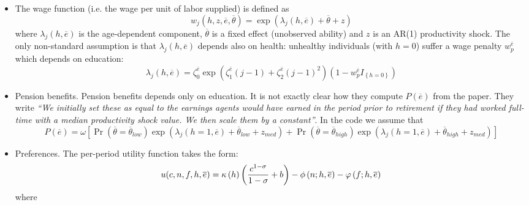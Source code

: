 \documentclass[12pt,a4paper]{article}
\begin{document}
\begin{itemize}
\item The wage function (i.e. the wage per unit of labor supplied) is
defined as%
\begin{equation*}
w_{j}\left( h,z,\overline{e},\overline{\theta }\right) =\exp \left( \lambda
_{j}\left( h,\overline{e}\right) +\overline{\theta }+z\right) 
\end{equation*}%
where $\lambda _{j}\left( h,\overline{e}\right) $ is the age-dependent
component, $\overline{\theta }$ is a fixed effect (unobserved ability) and $z
$ is an AR(1) productivity shock. The only non-standard assumption is that $%
\lambda _{j}\left( h,\overline{e}\right) $ depends also on health: unhealthy
individuals (with $h=0$) suffer a wage penalty $w_{p}^{\overline{e}}$ which
depends on education:%
\begin{equation*}
\lambda _{j}\left( h,\overline{e}\right) =\zeta _{0}^{\overline{e}}\exp
\left( \zeta _{1}^{\overline{e}}\left( j-1\right) +\zeta _{2}^{\overline{e}%
}\left( j-1\right) ^{2}\right) \left( 1-w_{p}^{\overline{e}}I_{\left\{
h=0\right\} }\right) 
\end{equation*}

\item Pension benefits. Pension benefits depends only on education. It is
not exactly clear how they compute $P(\overline{e})$ from the paper. They
write \textit{\textquotedblleft We initially set these as equal to the
earnings agents would have earned in the period prior to retirement if they
had worked full-time with a median productivity shock value. We then scale
them by a constant\textquotedblright }. In the code we assume that 
\begin{equation*}
P(\overline{e})=\omega \left[ \Pr \left( \overline{\theta }=\overline{\theta 
}_{low}\right) \exp \left( \lambda _{j}\left( h=1,\overline{e}\right) +%
\overline{\theta }_{low}+z_{med}\right) +\Pr \left( \overline{\theta }=%
\overline{\theta }_{high}\right) \exp \left( \lambda _{j}\left( h=1,%
\overline{e}\right) +\overline{\theta }_{high}+z_{med}\right) \right] 
\end{equation*}

\item Preferences. The per-period utility function takes the form:%
\begin{equation*}
u(c,n,f,h,\overline{e})=\kappa \left( h\right) \left( \frac{c^{1-\sigma }}{%
1-\sigma }+b\right) -\phi \left( n;h,\overline{e}\right) -\varphi \left( f;h,%
\overline{e}\right) 
\end{equation*}%
where


\end{itemize}
\end{document}
